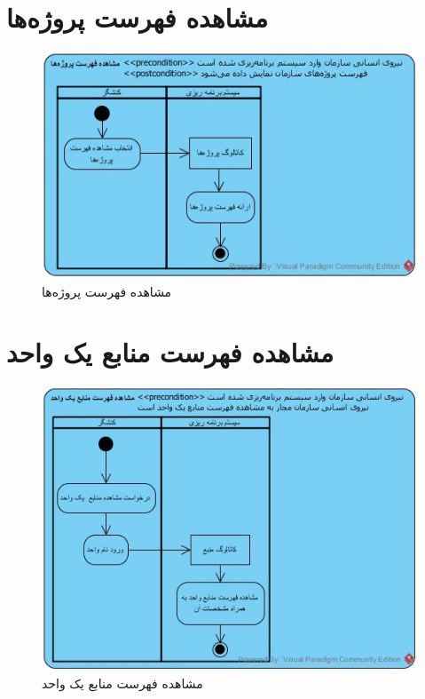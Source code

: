 \section{مشاهده فهرست پروژه‌ها}
\begin{figure}[H]
	\centering
	\includegraphics[scale=0.9]{img/activity/ViewListOfProjects}
	\caption{مشاهده فهرست پروژه‌ها}
\end{figure}


\section{مشاهده فهرست منابع یک واحد}
\begin{figure}[H]
	\centering
	\includegraphics[scale=0.8]{img/activity/ViewListOfResources}
	\caption{مشاهده فهرست منابع یک واحد}
\end{figure}

